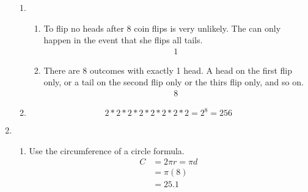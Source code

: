 \documentclass[11pt]{article}
\begin{document}
\begin{enumerate}
\begin{enumerate}
            \item
                \begin{enumerate}
                    \item To flip no heads after 8 coin flips is very unlikely. The can only happen in the event that she flips all tails.
                    \begin{equation*}
                        \begin{split}
                            1
                        \end{split}
                    \end{equation*}

                    \item There are 8 outcomes with exactly 1 head. A head on the first flip only, or a tail on the second flip only or the thirs flip only, and so on.
                    \begin{equation*}
                        \begin{split}
                            8
                        \end{split}
                    \end{equation*}
                \end{enumerate}
            \item
                \begin{equation*}
                    2*2*2*2*2*2*2*2=2^8=256
                \end{equation*}
        \end{enumerate}

    \pagebreak
    \item
        \begin{enumerate}
            \item Use the circumference of a circle formula.
            \begin{equation*}
                \begin{split}
                    C&=2 \pi r = \pi d\\
                    &=\pi(8)\\
                    &=25.1
                \end{split}
            \end{equation*}
            

\end{enumerate}
\end{enumerate}
\end{document}
